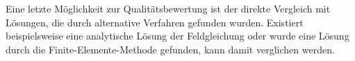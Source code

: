 Eine letzte Möglichkeit zur Qualitätsbewertung ist der direkte Vergleich mit Lösungen, die durch alternative Verfahren gefunden wurden.
Existiert beispielsweise eine analytische Lösung der Feldgleichung oder wurde eine Lösung durch die Finite-Elemente-Methode gefunden, kann damit verglichen werden.
